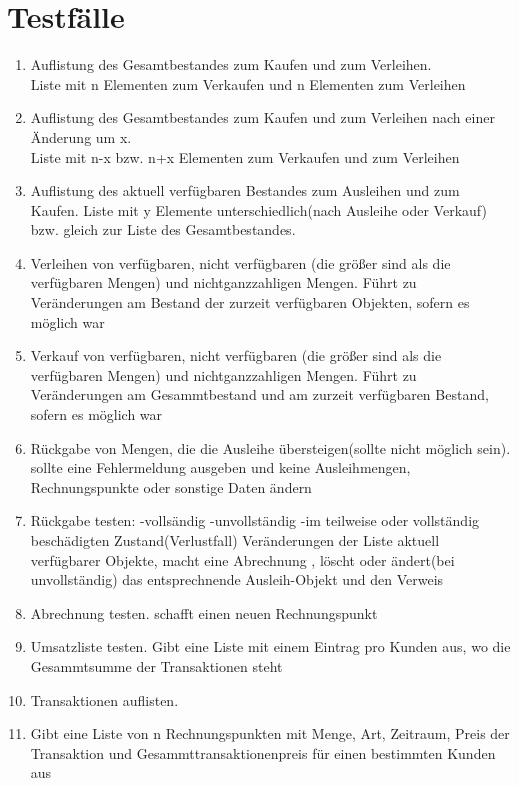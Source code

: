 \documentclass[a4paper,12pt,titlepage]{article}
\begin{document}
\part{Testfälle}
\begin{enumerate}
\item
Auflistung des Gesamtbestandes zum Kaufen und zum Verleihen.\\
\Rightarrow Liste mit n Elementen zum Verkaufen und n Elementen zum Verleihen
\item
Auflistung des Gesamtbestandes zum Kaufen und zum Verleihen nach einer Änderung um x.\\
\Rightarrow Liste mit n-x bzw. n+x Elementen zum Verkaufen und zum Verleihen
\item
Auflistung des aktuell verfügbaren Bestandes zum Ausleihen und zum Kaufen.
\Rightarrow Liste mit y Elemente unterschiedlich(nach Ausleihe oder Verkauf) bzw. gleich zur Liste des Gesamtbestandes. 
\item
Verleihen von verfügbaren, nicht verfügbaren (die größer sind als die verfügbaren Mengen) und nichtganzzahligen Mengen.
\Rightarrow Führt zu Veränderungen am Bestand der zurzeit verfügbaren Objekten, sofern es möglich war 
\item
Verkauf von verfügbaren, nicht verfügbaren (die größer sind als die verfügbaren Mengen) und nichtganzzahligen Mengen.
\Rightarrow Führt zu Veränderungen am Gesammtbestand und am zurzeit verfügbaren Bestand, sofern es möglich war
\item
Rückgabe von Mengen, die die Ausleihe übersteigen(sollte nicht möglich sein).
\Rightarrow sollte eine Fehlermeldung ausgeben und keine Ausleihmengen, Rechnungspunkte oder sonstige Daten ändern
\item
Rückgabe testen:
-vollsändig
-unvollständig 
-im teilweise oder vollständig beschädigten Zustand(Verlustfall)
\Rightarrow Veränderungen der Liste aktuell verfügbarer Objekte, macht eine Abrechnung , löscht oder ändert(bei unvollständig) das entsprechnende Ausleih-Objekt und den Verweis
\item
Abrechnung testen.
\Rightarrow schafft einen neuen Rechnungspunkt
\item
Umsatzliste testen.
\Rightarrow Gibt eine Liste mit einem Eintrag pro Kunden aus, wo die Gesammtsumme der Transaktionen steht
\item
Transaktionen auflisten.
\item
\Rightarrow Gibt eine Liste von n Rechnungspunkten mit Menge, Art, Zeitraum, Preis der Transaktion und Gesammttransaktionenpreis für einen bestimmten Kunden aus

\end{enumerate}
\end{document}
